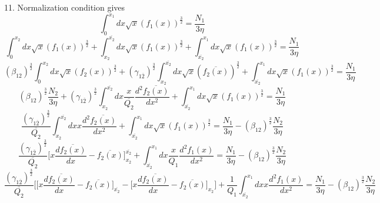 \documentclass[fleqn, 10pt]{article}
\begin{document}
11.        Normalization condition gives
        \begin{equation*}
            \int^{x_1}_0 dx \sqrt{x} (f_1(x))^\frac{3}{2} = \frac{N_1}{3\eta}
        \end{equation*}
        \begin{equation*}
            \int^{x_{2}}_0 dx \sqrt{x} (f_1(x))^\frac{3}{2} + \int^{\overline{x_{2}}}_{x_{2}}dx \sqrt{x} (f_1(x))^\frac{3}{2} + \int^{x_1}_{\overline{x_{2}}} dx \sqrt{x} (f_1(x))^\frac{3}{2} = \frac{N_1}{3\eta}        \end{equation*}
            \begin{equation*}
                (\beta_{12})^\frac{3}{2} \int^{x_{2}}_0 dx \sqrt{x} (f_{2}(x))^\frac{3}{2} + (\gamma_{1\overline{2}})^\frac{3}{2} \int^{\overline{x_{2}}}_{x_{2}} dx \sqrt{x} (\overline{f_{2}(x)})^\frac{3}{2} + \int^{x_1}_{\overline{x_{2}}} dx \sqrt{x} (f_1(x))^\frac{3}{2} = \frac{N_1}{3\eta}
            \end{equation*}
            \begin{equation*}
                (\beta_{12})^\frac{3}{2}\frac{N_{2}}{3\eta} + (\gamma_{1\overline{2}})^\frac{3}{2} \int^{\overline{x_{2}}}_{x_{2}} dx \frac{x}{\overline{Q_{2}}}\frac{d^2\overline{f_{2}(x)}}{dx^2}+ \int^{x_1}_{\overline{x_{2}}} dx \sqrt{x} (f_1(x))^\frac{3}{2} = \frac{N_1}{3\eta}
            \end{equation*}
            \begin{equation*}
                \frac{(\gamma_{1\overline{2}})^\frac{3}{2}}{\overline{Q_{2}}} \int^{\overline{x_{2}}}_{x_{2}} dx x \frac{d^2\overline{f_{2}(x)}}{dx^2} + \int^{x_1}_{\overline{x_{2}}} dx \sqrt{x}(f_1(x))^\frac{3}{2} = \frac{N_1}{3\eta} - (\beta_{12})^\frac{3}{2}\frac{N_{2}}{3\eta}
            \end{equation*}
            \begin{equation*}
               \frac{(\gamma_{1\overline{2}})^\frac{3}{2}}{\overline{Q_{2}}}\biggl[x\frac{d\overline{f_{2}(x)}}{dx}- \overline{f_{2}(x)}\biggr]^{\overline{x_{2}}}_{x_{2}} + \int^{x_1}_{\overline{x_{2}}} dx \frac{x}{Q_1}\frac{d^2f_1(x)}{dx^2} = \frac{N_1}{3\eta} - (\beta_{12})^\frac{3}{2}\frac{N_{2}}{3\eta}
            \end{equation*}
            \begin{equation*}
                \frac{(\gamma_{1\overline{2}})^\frac{3}{2}}{\overline{Q_{2}}} \biggl[\biggl[x\frac{d\overline{f_{2}(x)}}{dx} - \overline{f_{2}(x)}\biggr]_{\overline{x_{2}}} - \biggl[x\frac{d\overline{f_{2}(x)}}{dx}-\overline{f_{2}(x)}\biggr]_{x_{2}}\biggr]+ \frac{1}{Q_1} \int^{x_1}_{\overline{x_{2}}}dx x \frac{d^2f_1(x)}{dx^2} = \frac{N_1}{3\eta} - (\beta_{12})^\frac{3}{2}\frac{N_{2}}{3\eta}
            \end{equation*}
\end{document}
